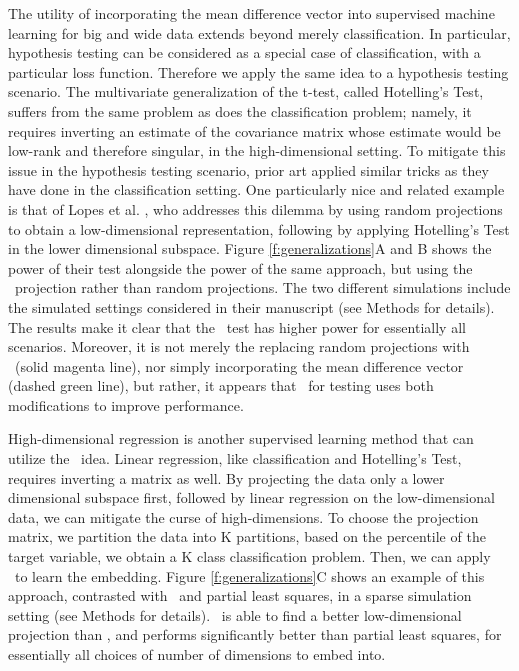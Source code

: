 \documentclass[10pt]{article}
\begin{document}
The utility of incorporating the mean difference vector into supervised machine learning for big and wide data extends beyond merely classification.  In particular, hypothesis testing can be considered as a special case of classification, with a particular loss function.  Therefore we apply the same idea to a hypothesis testing scenario.  The multivariate generalization of the t-test, called Hotelling's Test, suffers from the same problem as does the classification problem; namely, it requires inverting an estimate of the covariance matrix whose estimate would be low-rank and therefore singular, in the high-dimensional setting. To mitigate this issue in the hypothesis testing scenario, prior art applied similar tricks as they have done in the classification setting. One particularly nice and related example is that of  Lopes et al. \cite{Lopes2011a}, who addresses this dilemma by using random projections to obtain a low-dimensional representation, following by applying Hotelling's Test in the lower dimensional subspace.  Figure \ref{f:generalizations}A and B shows the power of their test alongside the power of the same approach, but using the \Lol~projection rather than random projections.  The two different simulations include the simulated settings considered in their manuscript (see Methods for details).  The results make it clear that the \Lol~test has higher power for essentially all scenarios.  Moreover, it is not merely the replacing random projections with \Pca~(solid magenta line), nor simply incorporating the mean difference vector (dashed green line), but rather, it appears that \Lol~for testing uses both modifications to improve performance.

High-dimensional  regression is another supervised learning method that can utilize the \Lol~idea. Linear regression, like classification and Hotelling's Test, requires inverting a  matrix as well.  By projecting the data only a lower dimensional subspace first, followed by linear regression on the low-dimensional data, we can mitigate the curse of high-dimensions.  To choose the projection matrix, we partition the data into K partitions, based on the percentile of the target variable, we obtain a K class classification problem.  Then, we can apply \Lol~to learn the embedding.  Figure \ref{f:generalizations}C shows an example of this approach, contrasted with \Lasso~and partial least squares, in a sparse simulation setting (see Methods for details). \Lol~is able to find a better low-dimensional projection than \Lasso, and performs significantly better than partial least squares, for essentially all choices of number of dimensions to embed into.
\end{document}
